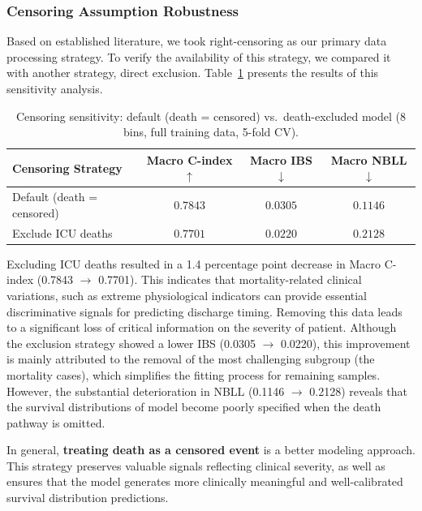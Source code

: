 \documentclass[10pt, a4paper]{article}
\begin{document}
\subsubsection{Censoring Assumption Robustness}

Based on established literature\cite{katzman2018deepsurv}, we took right-censoring as our primary data processing strategy. To verify the availability of this strategy, we compared it with another strategy, direct exclusion. Table~\ref{tab:censoring_sensitivity} presents the results of this sensitivity analysis. 

\begin{table}[htbp]
\centering
\caption{Censoring sensitivity: default (death = censored) vs.\ death-excluded model (8 bins, full training data, 5-fold CV).}
\label{tab:censoring_sensitivity}
\begin{tabular}{lccc}
\toprule
\textbf{Censoring Strategy} & \textbf{Macro C-index $\uparrow$} & \textbf{Macro IBS $\downarrow$} & \textbf{Macro NBLL $\downarrow$} \\
\midrule
Default (death = censored) & $\mathbf{0.7843}$ & $0.0305$ & $\mathbf{0.1146}$ \\
Exclude ICU deaths         & $0.7701$ & $\mathbf{0.0220}$ & $0.2128$ \\
\bottomrule
\end{tabular}
\end{table}

Excluding ICU deaths resulted in a 1.4 percentage point decrease in Macro C-index (0.7843 $\to$ 0.7701). This indicates that mortality-related clinical variations, such as extreme physiological indicators can provide essential discriminative signals for predicting discharge timing. Removing this data leads to a significant loss of critical information on the severity of patient. Although the exclusion strategy showed a lower IBS (0.0305 $\to$ 0.0220), this improvement is mainly attributed to the removal of the most challenging subgroup (the mortality cases), which simplifies the fitting process for remaining samples. However, the substantial deterioration in NBLL (0.1146 $\to$ 0.2128) reveals that the survival distributions of model become poorly specified when the death pathway is omitted.

In general, \textbf{treating death as a censored event} is a better modeling approach. This strategy preserves valuable signals reflecting clinical severity, as well as ensures that the model generates more clinically meaningful and well-calibrated survival distribution predictions. 
\end{document}
